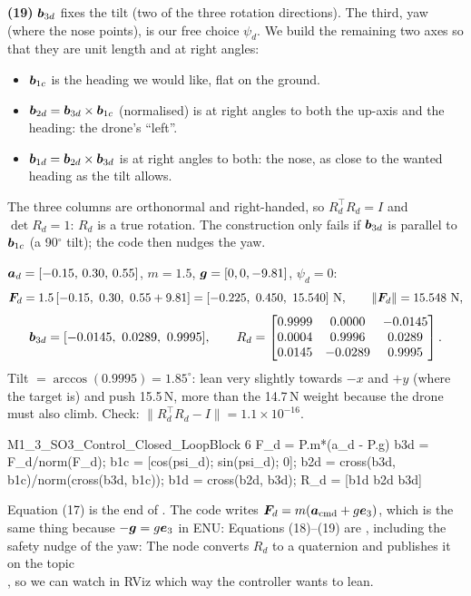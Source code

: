 \textbf{(19)} $\bm{b}_{3d}$ fixes the tilt (two of the three rotation directions). The third, yaw (where the nose points),
is our free choice $\psi_d$. We build the remaining two axes so that they are unit length and at right angles:
\begin{itemize}
  \item $\bm{b}_{1c}$ is the heading we would like, flat on the ground.
  \item $\bm{b}_{2d}=\bm{b}_{3d}\times\bm{b}_{1c}$ (normalised) is at right angles to both the up-axis and the heading: the drone's ``left''.
  \item $\bm{b}_{1d}=\bm{b}_{2d}\times\bm{b}_{3d}$ is at right angles to both: the nose, as close to the wanted heading as the tilt allows.
\end{itemize}
The three columns are orthonormal and right-handed, so $R_d^\top R_d=I$ and $\det R_d=1$: $R_d$ is a true rotation.
The construction only fails if $\bm{b}_{3d}$ is parallel to $\bm{b}_{1c}$ (a 90$^\circ$ tilt); the code then nudges the yaw.

\begin{toy}
$\bm{a}_d=[-0.15,\,0.30,\,0.55]$, $m=1.5$, $\bm{g}=[0,0,-9.81]$, $\psi_d=0$:
\[
\vF_d=1.5\,[-0.15,\ 0.30,\ 0.55+9.81]=[-0.225,\ 0.450,\ 15.540]\ \text{N},\qquad \|\vF_d\|=15.548\ \text{N},
\]
\[
\vb_{3d}=[-0.0145,\ 0.0289,\ 0.9995],\qquad
R_d=\begin{bmatrix}0.9999&0.0000&-0.0145\\0.0004&0.9996&0.0289\\0.0145&-0.0289&0.9995\end{bmatrix}.
\]
Tilt $=\arccos(0.9995)=1.85^\circ$: lean very slightly towards $-x$ and $+y$ (where the target is) and push 15.5\,N,
more than the 14.7\,N weight because the drone must also climb. Check: $\|R_d^\top R_d-I\|=1.1\times10^{-16}$.
\end{toy}

\begin{toycode}{M1\_3\_SO3\_Control\_Closed\_Loop}{Block 6}
F_d = P.m*(a_d - P.g)                 %
b3d = F_d/norm(F_d);
b1c = [cos(psi_d); sin(psi_d); 0];
b2d = cross(b3d, b1c)/norm(cross(b3d, b1c));
b1d = cross(b2d, b3d);
R_d = [b1d b2d b3d]
\end{toycode}

\begin{real}
Equation (17) is the end of . The code writes $\bm{F}_d=m(\bm{a}_{\text{cmd}}+g\bm{e}_3)$, which is
the same thing because $-\bm{g}=g\bm{e}_3$ in ENU:
Equations (18)--(19) are , including the safety nudge of the yaw:
The node converts $R_d$ to a quaternion and publishes it on the topic\\
, so we can watch in RViz which way the controller wants to lean.
\end{real}

